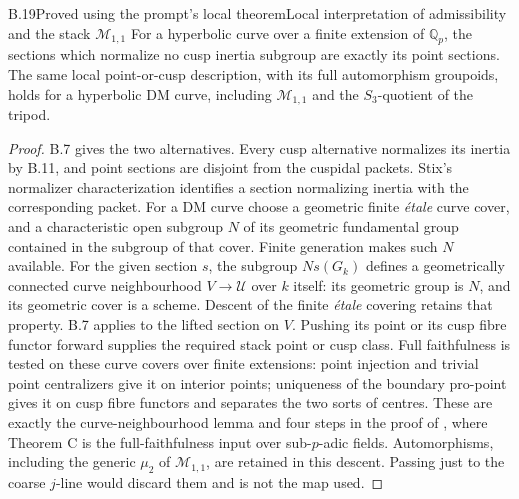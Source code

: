 \begin{statement}{B.19}{Proved using the prompt's local theorem}{Local interpretation of admissibility and the stack $\mathcal M_{1,1}$}
For a hyperbolic curve over a finite extension of $\mathbb Q_p$, the
sections which normalize no cusp inertia subgroup are exactly its
point sections.  The same local point-or-cusp description, with its
full automorphism groupoids, holds for a hyperbolic DM curve, including
$\mathcal M_{1,1}$ and the $S_3$-quotient of the tripod.
\end{statement}
\begin{proof}
B.7 gives the two alternatives.  Every cusp alternative normalizes
its inertia by B.11, and point sections are disjoint from the
cuspidal packets.  Stix's normalizer characterization identifies a
section normalizing inertia with the corresponding packet.
For a DM curve choose a geometric finite \emph{\'etale} curve cover,
and a characteristic open subgroup $N$ of its geometric fundamental
group contained in the subgroup of that cover.  Finite generation
makes such $N$ available.  For the given section $s$, the subgroup
$Ns(G_k)$ defines a geometrically connected curve neighbourhood
$V\to\mathcal U$ over $k$ itself: its geometric group is $N$,
and its geometric cover is a scheme.  Descent of the finite
\emph{\'etale} covering retains that property.  B.7 applies to the
lifted section on $V$.  Pushing its point or its cusp fibre functor
forward supplies the required stack point or cusp class.
Full faithfulness is tested on these curve covers over finite
extensions: point injection and trivial point centralizers give it
on interior points; uniqueness of the boundary pro-point gives it
on cusp fibre functors and separates the two sorts of centres.
These are exactly the curve-neighbourhood lemma and four steps in
the proof of
\cite[Theorems B and C]{B_Steklov}, where Theorem C is the
full-faithfulness input over sub-$p$-adic fields.
Automorphisms, including the generic $\mu_2$ of
$\mathcal M_{1,1}$, are retained in this descent.  Passing just to
the coarse $j$-line would discard them and is not the map used.
\end{proof}


